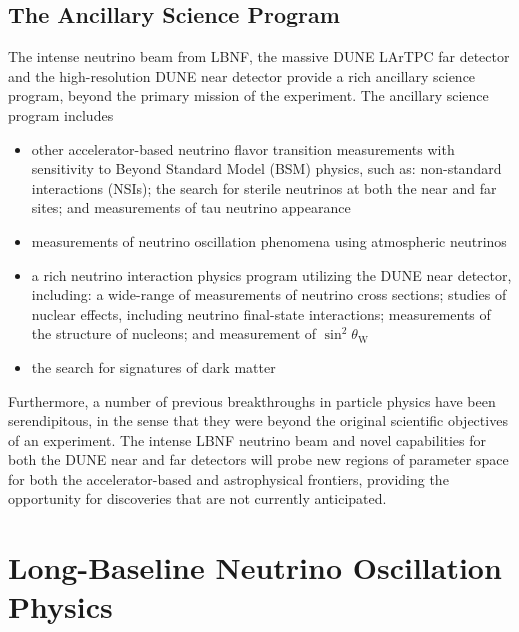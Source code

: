 \subsection{The Ancillary Science Program}

The intense neutrino beam from LBNF, the massive DUNE LArTPC far detector and the high-resolution
  DUNE near detector provide a rich ancillary science program, beyond the primary mission of the experiment. The ancillary science program includes
\begin{itemize}
     \item other accelerator-based neutrino flavor transition measurements with sensitivity to Beyond Standard Model (BSM) physics, such as: non-standard interactions (NSIs); the search for sterile neutrinos at both the near and far sites;
 and measurements of tau neutrino appearance
     \item measurements of neutrino oscillation phenomena using atmospheric neutrinos
     \item a rich neutrino interaction physics program utilizing the DUNE near detector, including: a wide-range of measurements of neutrino cross sections; studies of nuclear effects, including neutrino final-state interactions; measurements of the structure of nucleons; and  measurement of $\sin^2\theta_\text{W}$
     \item  the search for signatures of dark matter
\end{itemize} 
Furthermore, a number of previous breakthroughs in particle physics have been serendipitous, in the sense that they were beyond the
original scientific objectives of an experiment. The intense LBNF neutrino beam and novel capabilities for both 
the DUNE near and far detectors will probe new regions of parameter space for both the accelerator-based and astrophysical frontiers, 
providing the opportunity for discoveries that are not currently anticipated.



\section{Long-Baseline Neutrino Oscillation Physics}

